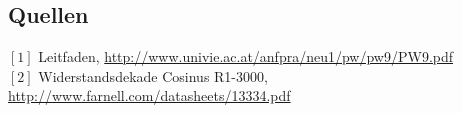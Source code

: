 \documentclass[12pt,a4paper]{article}
\begin{document}
\begin{multicols}{2}
\section{Quellen}
$[1]$ Leitfaden, \url{http://www.univie.ac.at/anfpra/neu1/pw/pw9/PW9.pdf}\\
$[2]$ Widerstandsdekade Cosinus R1-3000, \url{http://www.farnell.com/datasheets/13334.pdf}\\

\end{multicols}
\end{document}
